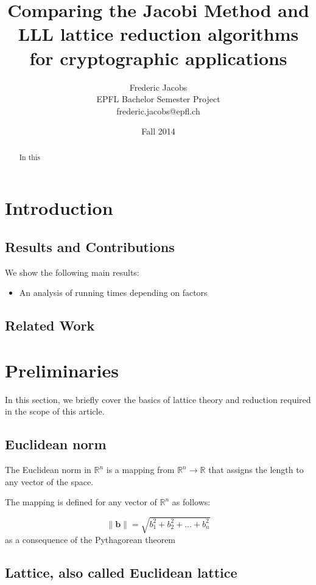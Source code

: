 \documentclass[10pt]{article}
\title{Comparing the Jacobi Method and LLL lattice reduction algorithms for cryptographic applications}
\date{Fall 2014}
\author{Frederic Jacobs\\ EPFL Bachelor Semester Project\\ frederic.jacobs@epfl.ch}
\begin{document}
\maketitle

\begin{abstract}
In this \cite{originalJacobiMethodLatticeBasisReduction}
\end{abstract}

\section{Introduction}
\subsection{Results and Contributions}

We show the following main results:
\begin{itemize}
\item An analysis of running times depending on factors
\end{itemize}

\subsection{Related Work}

\section{Preliminaries}

In this section, we briefly cover the basics of lattice theory and reduction required in the scope of this article.

\subsection{Euclidean norm}

The Euclidean norm in $\mathbb{R}^n$ is a mapping from $\mathbb{R}^n \to \mathbb{R}$ that assigns the length to any vector of the space.

The mapping is defined for any vector of $\mathbb{R}^n$ as follows: 

\[
\|\mathbf{b}\| = \sqrt{b_1^2 + b_2^2 + ... + b_n^2} 
\] 
as a consequence of the Pythagorean theorem

\subsection{Lattice, also called Euclidean lattice}
\end{document}
